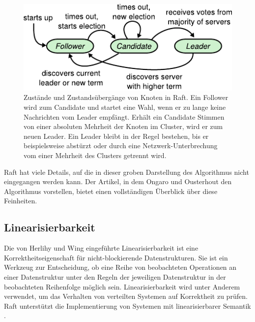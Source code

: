 \documentclass[12pt,a4paper]{report}
\begin{document}
\begin{figure}[H]
	\centering
	\includegraphics[width=.8\linewidth]{img/raft_state_machine.pdf}
    \caption[Zustände und Zustandsübergänge von Knoten in Raft]{
		Zustände und Zustandsübergänge von Knoten in Raft. Ein Follower wird zum Candidate und startet eine Wahl, wenn er zu lange
		keine Nachrichten vom Leader empfängt. Erhält ein Candidate Stimmen von einer absoluten Mehrheit der Knoten im Cluster,
		wird er zum neuen Leader. Ein Leader bleibt in der Regel bestehen, bis er beispielsweise abstürzt oder durch eine
		Netzwerk-Unterbrechung vom einer Mehrheit des Clusters getrennt wird. \cite{raft_original_paper}
	}
	\label{fig:raft_states}
\end{figure}

Raft hat viele Details, auf die in dieser groben Darstellung des Algorithmus nicht eingegangen werden kann. Der Artikel, in dem
Ongaro und Ousterhout \cite{raft_original_paper} den Algorithmus vorstellen, bietet einen vollständigen Überblick über diese
Feinheiten.

\subsection{Linearisierbarkeit}
Die von Herlihy und Wing \cite{linearizability_paper} eingeführte Linearisierbarkeit ist eine Korrektheitseigenschaft für
nicht-blockierende Datenstrukturen. Sie ist ein Werkzeug zur Entscheidung, ob eine Reihe von beobachteten Operationen an einer
Datenstruktur unter den Regeln der jeweiligen Datenstruktur in der beobachteten Reihenfolge möglich sein. Linearisierbarkeit wird
unter Anderem verwendet, um das Verhalten von verteilten Systemen auf Korrektheit zu prüfen. Raft unterstützt die Implementierung
von Systemen mit linearisierbarer Semantik \cite{raft_original_paper}.
\end{document}

